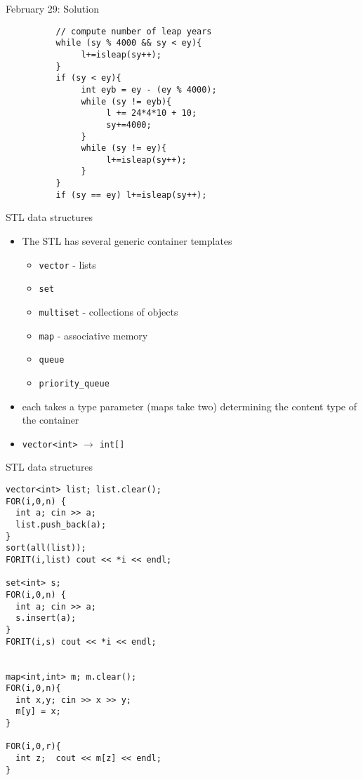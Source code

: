 \documentclass[12pt,t]{beamer}
\newcommand{\bi}{\begin{itemize}}
\newcommand{\ei}{\end{itemize}}
\begin{document}
\begin{frame}[fragile]{February 29: Solution}
    \begin{verbatim}
          // compute number of leap years
          while (sy % 4000 && sy < ey){
               l+=isleap(sy++);
          }
          if (sy < ey){
               int eyb = ey - (ey % 4000);
               while (sy != eyb){
                    l += 24*4*10 + 10;
                    sy+=4000;
               }
               while (sy != ey){
                    l+=isleap(sy++);
               }
          }
          if (sy == ey) l+=isleap(sy++);
\end{verbatim}
\end{frame}





\begin{frame}[fragile]{STL data structures}
  \bi
    \item The STL has several generic container templates
      \bi
	\item \texttt{vector} - lists
	\item \texttt{set}
	\item \texttt{multiset} - collections of objects
	\item \texttt{map} - associative memory
	\item \texttt{queue}
	\item \texttt{priority\_queue}
      \ei
    \item each takes a type parameter (maps take two) determining the content type of the container
    \item \texttt{vector<int>} $\rightarrow$ \texttt{int[]}
  \ei
\end{frame}


\begin{frame}[fragile]{STL data structures}

\begin{verbatim}
vector<int> list; list.clear();
FOR(i,0,n) {
  int a; cin >> a;
  list.push_back(a);
}
sort(all(list));
FORIT(i,list) cout << *i << endl;

set<int> s;
FOR(i,0,n) {
  int a; cin >> a;
  s.insert(a);
}
FORIT(i,s) cout << *i << endl;


map<int,int> m; m.clear();
FOR(i,0,n){
  int x,y; cin >> x >> y;
  m[y] = x;
}

FOR(i,0,r){
  int z;  cout << m[z] << endl;
}
\end{verbatim}
\end{frame}
\end{document}
